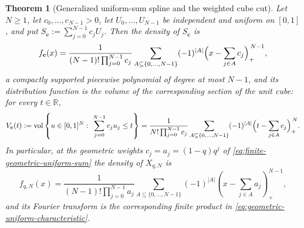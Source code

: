 \documentclass[11pt,oneside,openany]{book}
\newtheorem{theorem}{Theorem}[chapter]
\theoremstyle{definition}
\theoremstyle{remark}
\newcommand{\R}{\mathbb R}
\newcommand{\abs}[1]{\lvert #1\rvert}
\newcommand{\set}[1]{\left\{#1\right\}}
\newcommand{\defeq}{\mathrel{:=}}
\begin{document}
\begin{theorem}[Generalized uniform-sum spline and the weighted cube cut]\label{thm:finite-uniform-spline}
Let $N\ge1$, let $c_0,\ldots,c_{N-1}>0$, let $U_0,\ldots,U_{N-1}$ be independent and
uniform on $[0,1]$, and put $S_{\mathbf c}\defeq\sum_{j=0}^{N-1}c_jU_j$.  Then the density
of $S_{\mathbf c}$ is
\begin{equation}\label{eq:general-uniform-spline}
 f_{\mathbf c}(x)
 =\frac1{(N-1)!\prod_{j=0}^{N-1}c_j}
  \sum_{A\subseteq\set{0,\ldots,N-1}}(-1)^{\abs A}
  \Bigl(x-\sum_{j\in A}c_j\Bigr)_+^{\,N-1},
\end{equation}
a compactly supported piecewise polynomial of degree at most $N-1$, and its distribution
function is the volume of the corresponding section of the unit cube: for every
$t\in\R$,
\begin{equation}\label{eq:weighted-cube-cut}
 V_{\mathbf c}(t)
 \defeq\operatorname{vol}\set{u\in[0,1]^N:\ \sum_{j=0}^{N-1}c_ju_j\le t}
 =\frac1{N!\prod_{j=0}^{N-1}c_j}
  \sum_{A\subseteq\set{0,\ldots,N-1}}(-1)^{\abs A}
  \Bigl(t-\sum_{j\in A}c_j\Bigr)_+^{\,N}.
\end{equation}
In particular, at the geometric weights $c_j=a_j=(1-q)q^j$ of
\eqref{eq:finite-geometric-uniform-sum} the density of $X_{q,N}$ is
\begin{equation}\label{eq:finite-uniform-spline}
 f_{q,N}(x)
 =\frac1{(N-1)!\prod_{j=0}^{N-1}a_j}
 \sum_{A\subseteq\{0,\ldots,N-1\}}
 (-1)^{\abs A}
 \left(x-\sum_{j\in A}a_j\right)_+^{N-1},
\end{equation}
and its Fourier transform is the corresponding finite product in
\eqref{eq:geometric-uniform-characteristic}.
\end{theorem}
\end{document}
